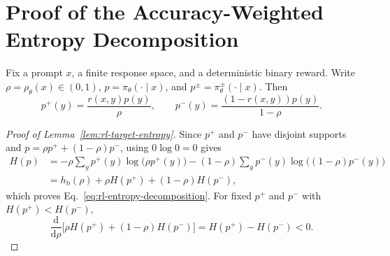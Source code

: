 \section{Proof of the Accuracy-Weighted Entropy Decomposition}
\label{app:rl-target-entropy}

Fix a prompt $x$, a finite response space, and a deterministic binary reward.
Write $\rho=\rho_\theta(x)\in(0,1)$,
$p=\pi_\theta(\cdot\mid x)$, and $p^\pm=\pi_\theta^\pm(\cdot\mid x)$.
Then
\begin{equation}
 p^+(y)=\frac{r(x,y)p(y)}{\rho},
 \qquad
 p^-(y)=\frac{(1-r(x,y))p(y)}{1-\rho}.
 \label{eq:rl-success-failure-distributions}
\end{equation}

\begin{proof}[Proof of Lemma~\ref{lem:rl-target-entropy}]
Since $p^+$ and $p^-$ have disjoint supports and
$p=\rho p^++(1-\rho)p^-$, using $0\log0=0$ gives
\begin{align*}
 H(p)
 &=-\rho\sum_y p^+(y)\log\bigl(\rho p^+(y)\bigr)
   -(1-\rho)\sum_y p^-(y)\log\bigl((1-\rho)p^-(y)\bigr)\\
 &=h_{\mathrm b}(\rho)+\rho H(p^+)+(1-\rho)H(p^-),
\end{align*}
which proves Eq.~\eqref{eq:rl-entropy-decomposition}.
For fixed $p^+$ and $p^-$ with $H(p^+)<H(p^-)$,
\begin{equation*}
 \frac{\mathrm d}{\mathrm d\rho}
 \bigl[\rho H(p^+)+(1-\rho)H(p^-)\bigr]
 =H(p^+)-H(p^-)<0.
\end{equation*}
\end{proof}
